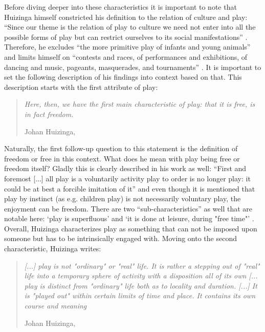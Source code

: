 Before diving deeper into these characteristics it is important to note that Huizinga himself constricted his definition to the relation of culture and play: \enquote{Since our theme is the relation of play to culture we need not enter into all the possible forms of play but can restrict ourselves to its social manifestations} \cite[p. 7]{huizinga2020homo}. Therefore, he excludes \enquote{the more primitive play of infants and young animals} \cite[p. 7]{huizinga2020homo} and limits himself on \enquote{contests and races, of performances and exhibitions, of dancing and music, pageants, masquerades, and tournaments} \cite[p. 7]{huizinga2020homo}. It is important to set the following description of his findings into context based on that. This description starts with the first attribute of play:

\begin{quote}
  \textit{Here, then, we have the first main characteristic of play: that it is free, is in fact freedom.}

  \footnotesize{Johan Huizinga, \cite[p. 8]{huizinga2020homo}}
\end{quote}

Naturally, the first follow-up question to this statement is the definition of freedom or free in this context. What does he mean with play being free or freedom itself? Gladly this is clearly described in his work as well: \enquote{First and foremost [...] all play is a voluntarily activity play to order is no longer play: it could be at best a forcible imitation of it} \cite[p. 7]{huizinga2020homo} and even though it is mentioned that play by instinct (as e.g. children play) is not necessarily voluntary play, the enjoyment can be freedom. There are two \enquote{sub-characteristics} as well that are notable here: \enquote*{play is superfluous} and \enquote*{it is done at leisure, during "free time"} \cite[p. 8]{huizinga2020homo}. Overall, Huizinga characterizes play as something that can not be imposed upon someone but has to be intrinsically engaged with. Moving onto the second characteristic, Huizinga writes:

\begin{quote}
  \textit{[...] play is not "ordinary" or "real" life. It is rather a stepping out of "real" life into a temporary sphere of activity with a disposition all of its own [... play is distinct from "ordinary" life both as to locality and duration. [...] It is "played out" within certain limits of time and place. It contains its own course and meaning}

  \footnotesize{Johan Huizinga, \cite[p. 8-9]{huizinga2020homo}}
\end{quote}


